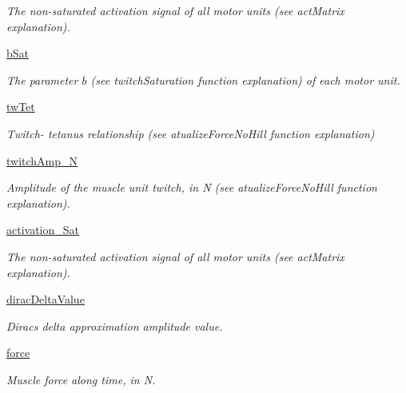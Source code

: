 \begin{DoxyCompactItemize}
\begin{DoxyCompactList}\small\item\em The non-\/saturated activation signal of all motor units (see act\+Matrix explanation). \end{DoxyCompactList}\item 
\hyperlink{class_motor_unit_pool_1_1_motor_unit_pool_a4e107835e34b4f56d06b9b28c143fe40}{b\+Sat}
\begin{DoxyCompactList}\small\item\em The parameter $b$ (see twitch\+Saturation function explanation) of each motor unit. \end{DoxyCompactList}\item 
\hyperlink{class_motor_unit_pool_1_1_motor_unit_pool_a785a769c5b4824603a24339e4f0d8dfe}{tw\+Tet}
\begin{DoxyCompactList}\small\item\em Twitch-\/ tetanus relationship (see atualize\+Force\+No\+Hill function explanation) \end{DoxyCompactList}\item 
\hyperlink{class_motor_unit_pool_1_1_motor_unit_pool_a03538b06e7220f9d48c7306ed6508c05}{twitch\+Amp\+\_\+N}
\begin{DoxyCompactList}\small\item\em Amplitude of the muscle unit twitch, in N (see atualize\+Force\+No\+Hill function explanation). \end{DoxyCompactList}\item 
\hyperlink{class_motor_unit_pool_1_1_motor_unit_pool_ac475d1369c38d0bc5064c7243b4e1d44}{activation\+\_\+\+Sat}
\begin{DoxyCompactList}\small\item\em The non-\/saturated activation signal of all motor units (see act\+Matrix explanation). \end{DoxyCompactList}\item 
\hyperlink{class_motor_unit_pool_1_1_motor_unit_pool_a48b53d4f838ca8cfe2bc41c8308f2060}{dirac\+Delta\+Value}
\begin{DoxyCompactList}\small\item\em Dirac\textquotesingle{}s delta approximation amplitude value. \end{DoxyCompactList}\item 
\hyperlink{class_motor_unit_pool_1_1_motor_unit_pool_a97011c17140c45a42a00105279f014ad}{force}
\begin{DoxyCompactList}\small\item\em Muscle force along time, in N. \end{DoxyCompactList}\item 

\end{DoxyCompactItemize}
